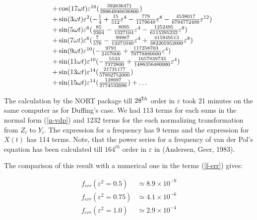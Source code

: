 \begin{equation}
\begin{array}{ll}
&+\cos(17\omega t) \varepsilon^{16} 
({\mathstrut 392636471 \over \mathstrut  29964946636800})\\
&+\sin(3\omega t) \varepsilon^2 (
-{\mathstrut 1 \over \mathstrut  4}
+{\mathstrut 15 \over \mathstrut  512} \varepsilon^4
-{\mathstrut 779 \over \mathstrut  1179648} \varepsilon^8
-{\mathstrut 4538017 \over \mathstrut  6794772480} 
\varepsilon^{12})\\
&+\sin(5\omega t) \varepsilon^6 ({\mathstrut 85 \over \mathstrut  2304}
-{\mathstrut 8095 \over \mathstrut  1327104} \varepsilon^4
-{\mathstrut 1252495 \over \mathstrut  6115295232} \varepsilon^8)\\
&+\sin(7\omega t) \varepsilon^6 ({\mathstrut 7 \over \mathstrut  576}
-{\mathstrut 99967 \over \mathstrut  13271040} \varepsilon^4
+{\mathstrut 415949513 \over \mathstrut  382205952000} \varepsilon^8)\\
&+\sin(9\omega t) \varepsilon^{10} (
-{\mathstrut 9791 \over \mathstrut  2457600}
+{\mathstrut 117258703 \over \mathstrut  70778880000} \varepsilon^4)\\
&+\sin(11\omega t) \varepsilon^{10} (
-{\mathstrut 5533 \over \mathstrut  7372800}
+{\mathstrut 1657839733 \over \mathstrut  1486356480000} \varepsilon^4)\\
&+\sin(13\omega t) \varepsilon^{14} 
({\mathstrut 21731177 \over \mathstrut  57802752000})\\
&+\sin(15\omega t) \varepsilon^{14} 
({\mathstrut 138697 \over \mathstrut  2774532096}) + \ldots

\end{array}
\end{equation}

   The calculation by the NORT package till $28^{\mbox th}$ order in 
$\varepsilon$ took 21 minutes on the same computer as for Duffing's case. 
We had 113 terms for  
each sums in the normal form (\ref{n-vdp}) and 1232 terms for
the each normalizing transformation from $Z_i$ to $Y_i$. The 
expression for a frequency has 9 terms and the expression for $X(t)$ 
has 114 terms. Note, that the power series for a frequency of van der 
Pol's equation has been calculated till $164^{th}$ order in $\varepsilon$ in
(Andersen, Geer, 1983).

The comparison of this result with a numerical one in the terms 
(\ref{f-err}) gives:

$$
\begin{array}{ll}
f_{err}(\varepsilon^2=0.5) &\simeq 8.9 \times 10^{-9}\\
f_{err}(\varepsilon^2=0.75) &\simeq 4.1 \times 10^{-6}\\
f_{err}(\varepsilon^2=1.0) &\simeq 2.9 \times 10^{-4}
\end{array}
$$

